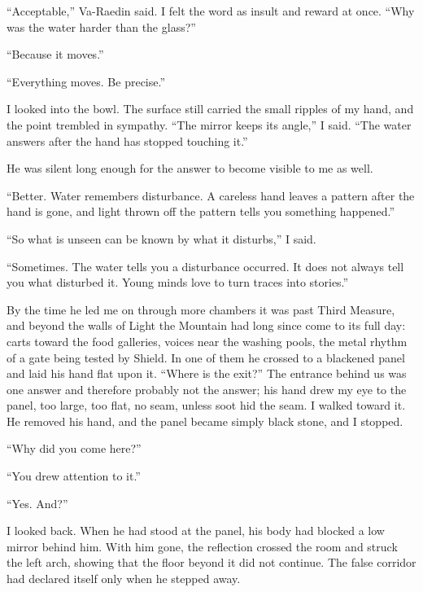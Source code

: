 ``Acceptable,'' Va-Raedin said. I felt the word as insult and reward at once. ``Why was the water harder than the glass?''\par
``Because it moves.''\par
``Everything moves. Be precise.''\par

I looked into the bowl. The surface still carried the small ripples of my hand, and the point trembled in sympathy. 
``The mirror keeps its angle,'' I said. ``The water answers after the hand has stopped touching it.''\par

He was silent long enough for the answer to become visible to me as well.\par

``Better.
Water remembers disturbance. 
A careless hand leaves a pattern after the hand is gone, and light thrown off the pattern tells you something happened.''\par

``So what is unseen can be known by what it disturbs,'' I said.\par
``Sometimes. The water tells you a disturbance occurred. It does not always tell you what disturbed it. Young minds love to turn traces into stories.''\par

\ornament

By the time he led me on through more chambers it was past Third Measure, and beyond the walls of Light the Mountain had long since come to its full day: 
carts toward the food galleries, voices near the washing pools, the metal rhythm of a gate being tested by Shield. 
In one of them he crossed to a blackened panel and laid his hand flat upon it. 
``Where is the exit?'' 
The entrance behind us was one answer and therefore probably not the answer; his hand drew my eye to the panel, too large, too flat, no seam, unless soot hid the seam. 
I walked toward it. 
He removed his hand, and the panel became simply black stone, and I stopped.\par

``Why did you come here?''\par
``You drew attention to it.''\par
``Yes. And?''\par

I looked back. 
When he had stood at the panel, his body had blocked a low mirror behind him. With him gone, the reflection crossed the room and struck the left arch, 
showing that the floor beyond it did not continue. 
The false corridor had declared itself only when he stepped away.\par

